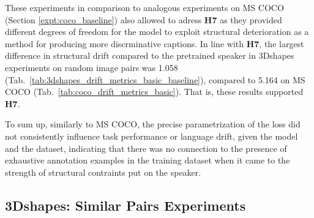 These experiments in comparison to analogous experiments on MS COCO (Section \ref{expt:coco_baseline}) also allowed to adress \textbf{H7} as they provided different degrees of freedom for the model to exploit structural deterioration as a method for producing more discrminative captions. In line with \textbf{H7}, the largest difference in structural drift compared to the pretrained speaker in 3Dshapes experiments on random image pairs was 1.058 (Tab.~\ref{tab:3dshapes_drift_metrics_basic_baseline}), compared to 5.164 on MS COCO (Tab.~\ref{tab:coco_drift_metrics_basic}). That is, these results supported \textbf{H7}.

To sum up, similarly to MS COCO, the precise parametrization of the loss did not consistently influence task performance or language drift, given the model and the dataset, indicating that there was no connection to the presence of exhaustive annotation examples in the training dataset when it came to the strength of structural contraints put on the speaker.

\subsection{3Dshapes: Similar Pairs Experiments}
\label{expt:3dsapes_similar}

